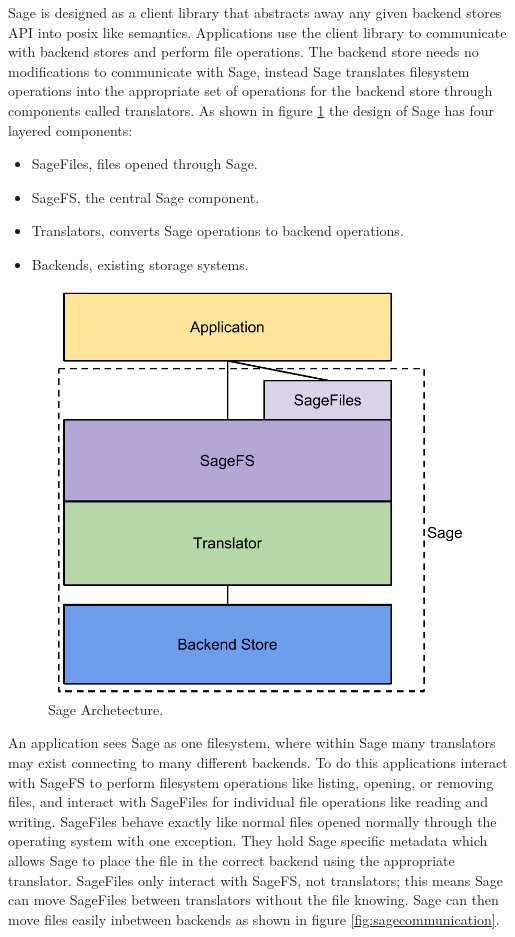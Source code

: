 Sage is designed as a client library that abstracts away any given backend stores API into posix like semantics. Applications use the client library to communicate with backend stores and perform file operations. The backend store needs no modifications to communicate with Sage, instead Sage translates filesystem operations into the appropriate set of operations for the backend store through components called translators. As shown in figure \ref{fig:archetecture} the design of Sage has four layered components:
\begin{itemize}
\item SageFiles, files opened through Sage.
\item SageFS, the central Sage component.
\item Translators, converts Sage operations to backend operations.
\item Backends, existing storage systems.
\end{itemize}

\begin{figure}[h!]
\centering
\includegraphics[scale=0.7]{figures/archetecture}
\caption[Sage Archetecture]{Sage Archetecture.}
\label{fig:archetecture}
\end{figure}

An application sees Sage as one filesystem, where within Sage many translators may exist connecting to many different backends. To do this applications interact with SageFS to perform filesystem operations like listing, opening, or removing files, and interact with SageFiles for individual file operations like reading and writing. SageFiles behave exactly like normal files opened normally through the operating system with one exception. They hold Sage specific metadata which allows Sage to place the file in the correct backend using the appropriate translator. SageFiles only interact with SageFS, not translators; this means Sage can move SageFiles between translators without the file knowing. Sage can then move files easily inbetween backends as shown in figure \ref{fig:sagecommunication}.

